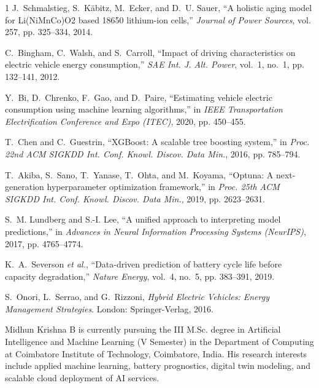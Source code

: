 \documentclass[journal]{IEEEtran}
\begin{document}
\begin{thebibliography}{1}
J.~Schmalstieg, S.~Käbitz, M.~Ecker, and D.~U. Sauer, ``A holistic aging model for Li(NiMnCo)O2 based 18650 lithium-ion cells,'' \emph{Journal of Power Sources}, vol. 257, pp. 325--334, 2014.

C.~Bingham, C.~Walsh, and S.~Carroll, ``Impact of driving characteristics on electric vehicle energy consumption,'' \emph{SAE Int. J. Alt. Power}, vol.~1, no.~1, pp. 132--141, 2012.

Y.~Bi, D.~Chrenko, F.~Gao, and D.~Paire, ``Estimating vehicle electric consumption using machine learning algorithms,'' in \emph{IEEE Transportation Electrification Conference and Expo (ITEC)}, 2020, pp. 450--455.

T.~Chen and C.~Guestrin, ``XGBoost: A scalable tree boosting system,'' in \emph{Proc. 22nd ACM SIGKDD Int. Conf. Knowl. Discov. Data Min.}, 2016, pp. 785--794.

T.~Akiba, S.~Sano, T.~Yanase, T.~Ohta, and M.~Koyama, ``Optuna: A next-generation hyperparameter optimization framework,'' in \emph{Proc. 25th ACM SIGKDD Int. Conf. Knowl. Discov. Data Min.}, 2019, pp. 2623--2631.

S.~M. Lundberg and S.-I. Lee, ``A unified approach to interpreting model predictions,'' in \emph{Advances in Neural Information Processing Systems (NeurIPS)}, 2017, pp. 4765--4774.

K.~A.~Severson \emph{et al.}, ``Data-driven prediction of battery cycle life before capacity degradation,'' \emph{Nature Energy}, vol.~4, no.~5, pp. 383--391, 2019.

S.~Onori, L.~Serrao, and G.~Rizzoni, \emph{Hybrid Electric Vehicles: Energy Management Strategies}. London: Springer-Verlag, 2016.
\end{thebibliography}

\begin{IEEEbiographynophoto}{Midhun Krishna B}
is currently pursuing the III M.Sc. degree in Artificial Intelligence and Machine Learning (V Semester) in the Department of Computing at Coimbatore Institute of Technology, Coimbatore, India. His research interests include applied machine learning, battery prognostics, digital twin modeling, and scalable cloud deployment of AI services.
\end{IEEEbiographynophoto}
\end{document}
